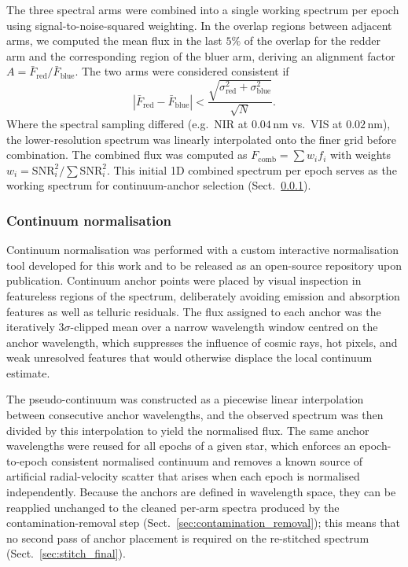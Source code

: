 The three spectral arms were combined into a single working spectrum
per epoch using signal-to-noise-squared weighting. In the overlap
regions between adjacent arms, we computed the mean flux in the last
$5\%$ of the overlap for the redder arm and the corresponding region
of the bluer arm, deriving an alignment factor
$A = \bar{F}_\mathrm{red} / \bar{F}_\mathrm{blue}$. The two arms were
considered consistent if
\begin{equation}
|\bar{F}_\mathrm{red} - \bar{F}_\mathrm{blue}| <
\frac{\sqrt{\sigma_\mathrm{red}^2 + \sigma_\mathrm{blue}^2}}{\sqrt{N}}.
\end{equation}
Where the spectral sampling differed (e.g.\ NIR at $0.04$\,nm
vs.\ VIS at $0.02$\,nm), the lower-resolution spectrum was linearly
interpolated onto the finer grid before combination. The combined flux
was computed as $F_\mathrm{comb} = \sum w_i f_i$ with weights
$w_i = \mathrm{SNR}_i^2 / \sum \mathrm{SNR}_i^2$. This initial 1D
combined spectrum per epoch serves as the working spectrum for
continuum-anchor selection (Sect.~\ref{sec:normalisation}).

\subsubsection{Continuum normalisation}
\label{sec:normalisation}

Continuum normalisation was performed with a custom interactive
normalisation tool developed for this work and to be released as an
open-source repository upon publication. Continuum anchor points were
placed by visual inspection in featureless regions of the spectrum,
deliberately avoiding emission and absorption features as well as
telluric residuals. The flux assigned to each anchor was the
iteratively $3\sigma$-clipped mean over a narrow wavelength window
centred on the anchor wavelength, which suppresses the influence of
cosmic rays, hot pixels, and weak unresolved features that would
otherwise displace the local continuum estimate.

The pseudo-continuum was constructed as a piecewise linear interpolation
between consecutive anchor wavelengths, and the observed spectrum was
then divided by this interpolation to yield the normalised flux. The
same anchor wavelengths were reused for all \Nepochs epochs of a given
star, which enforces an epoch-to-epoch consistent normalised continuum
and removes a known source of artificial radial-velocity scatter that
arises when each epoch is normalised independently. Because the anchors
are defined in wavelength space, they can be reapplied unchanged to the
cleaned per-arm spectra produced by the contamination-removal step
(Sect.~\ref{sec:contamination_removal}); this means that no second pass
of anchor placement is required on the re-stitched spectrum
(Sect.~\ref{sec:stitch_final}).

